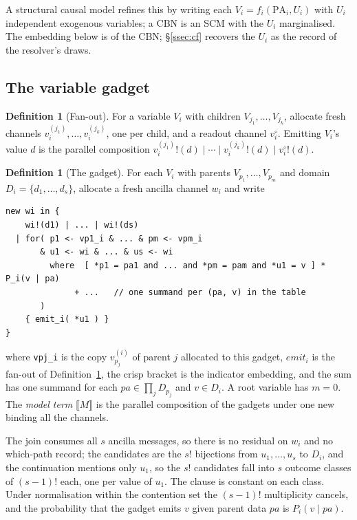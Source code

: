 \documentclass[11pt,a4paper]{article}
\theoremstyle{plain}
\theoremstyle{definition}
\newtheorem{definition}[theorem]{Definition}
\theoremstyle{remark}
\newcommand{\sem}[1]{\llbracket #1 \rrbracket}
\newcommand{\PA}{\mathrm{PA}}
\begin{document}
A structural causal model refines this by writing each $V_i = f_i(\PA_i, U_i)$
with $U_i$ independent exogenous variables; a CBN is an SCM with the $U_i$
marginalised. The embedding below is of the CBN; \S\ref{ssec:cf} recovers the
$U_i$ as the record of the resolver's draws.

\subsection{The variable gadget}

\begin{definition}[Fan-out]\label{def:fanout}
For a variable $V_i$ with children $V_{j_1},\dots,V_{j_k}$, allocate fresh
channels $v_i^{(j_1)},\dots,v_i^{(j_k)}$, one per child, and a readout channel
$v_i^{\circ}$. Emitting $V_i$'s value $d$ is the parallel composition
$v_i^{(j_1)}!(d) \mid \cdots \mid v_i^{(j_k)}!(d) \mid v_i^{\circ}!(d)$.
\end{definition}

\begin{definition}[The gadget]\label{def:gadget}
For each $V_i$ with parents $V_{p_1},\dots,V_{p_m}$ and domain $D_i =
\{d_1,\dots,d_s\}$, allocate a fresh ancilla channel $w_i$ and write
\begin{lstlisting}
new wi in {
    wi!(d1) | ... | wi!(ds)
  | for( p1 <- vp1_i & ... & pm <- vpm_i
       & u1 <- wi & ... & us <- wi
         where  [ *p1 = pa1 and ... and *pm = pam and *u1 = v ] * P_i(v | pa)
              + ...   // one summand per (pa, v) in the table
       )
    { emit_i( *u1 ) }
}
\end{lstlisting}
where \texttt{vpj\_i} is the copy $v_{p_j}^{(i)}$ of parent $j$ allocated to
this gadget, $\mathit{emit}_i$ is the fan-out of Definition~\ref{def:fanout},
the crisp bracket is the indicator embedding, and the sum has one summand for
each $\mathit{pa} \in \prod_j D_{p_j}$ and $v \in D_i$. A root variable has
$m = 0$.
The \emph{model term} $\sem{M}$ is the parallel composition of the gadgets under
one \textsf{new} binding all the channels.
\end{definition}

The join consumes all $s$ ancilla messages, so there is no residual on $w_i$
and no which-path record; the candidates are the $s!$ bijections from
$u_1,\dots,u_s$ to $D_i$, and the continuation mentions only $u_1$, so the $s!$
candidates fall into $s$ outcome classes of $(s-1)!$ each, one per value of
$u_1$. The clause is constant on each class. Under normalisation within the
contention set the $(s-1)!$ multiplicity cancels, and the probability that the
gadget emits $v$ given parent data $\mathit{pa}$ is $P_i(v \mid \mathit{pa})$.
\end{document}
